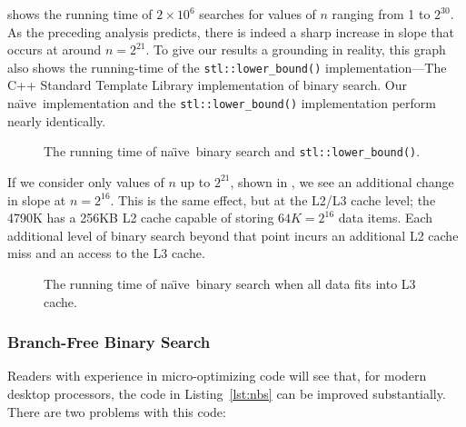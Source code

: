 \documentclass{patmorin}
\newcommand{\lstref}[1]{Listing~\ref{lst:#1}}
\newcommand{\naive}{na\"{\i}ve}
\begin{document}
 shows the running time of $2\times 10^6$ searches
for values of $n$ ranging from 1 to $2^{30}$. As the preceding analysis
predicts, there is indeed a sharp increase in slope that occurs at around
$n=2^{21}$.  To give our results a grounding in reality, this graph
also shows the running-time of the \texttt{stl::lower_bound()}
implementation---The C++ Standard Template Library implementation
of binary search.  Our \naive\ implementation and the
\texttt{stl::lower_bound()} implementation perform nearly
identically.


\begin{figure}
   \caption{The running time of \naive\ binary search and 
            \texttt{stl::lower_bound()}.}
\end{figure}

If we consider only values of $n$ up to $2^{21}$, shown in
, we see an additional change in slope at
$n=2^{16}$.  This is the same effect, but at the L2/L3 cache level; the
4790K has a 256KB L2 cache capable of storing $64K=2^{16}$ data items.
Each additional level of binary search beyond that point incurs an
additional L2 cache miss and an access to the L3 cache.

\begin{figure}
   \caption{The running time of \naive\ binary search when all data
    fits into L3 cache.}
\end{figure}


\subsubsection{Branch-Free Binary Search}

Readers with experience in micro-optimizing code will see that, for
modern desktop processors, the code in \lstref{nbs} can be improved
substantially.  There are two problems with this code:
\end{document}
